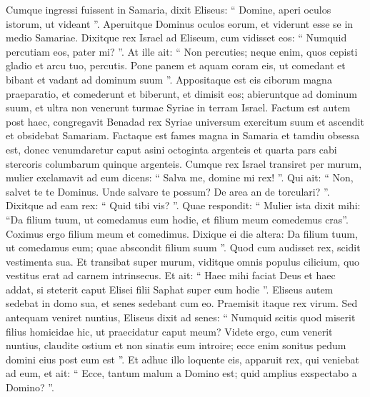 \begin{biblechapter}
\begin{biblechapter}
\begin{biblechapter}
\begin{biblechapter}
\begin{biblechapter}
\begin{biblechapter}
\verse Cumque ingressi fuissent in Samaria, dixit Eliseus: “ Domine, aperi oculos istorum, ut videant ”. Aperuitque Dominus oculos eorum, et viderunt esse se in medio Samariae.
 \verse Dixitque rex Israel ad Eliseum, cum vidisset eos: “ Numquid percutiam eos, pater mi? ”. 
\verse At ille ait: “ Non percuties; neque enim, quos cepisti gladio et arcu tuo, percutis. Pone panem et aquam coram eis, ut comedant et bibant et vadant ad dominum suum ”. 
\verse Appositaque est eis ciborum magna praeparatio, et comederunt et biberunt, et dimisit eos; abieruntque ad dominum suum, et ultra non venerunt turmae Syriae in terram Israel.
 \verse Factum est autem post haec, congregavit Benadad rex Syriae universum exercitum suum et ascendit et obsidebat Samariam. 
\verse Factaque est fames magna in Samaria et tamdiu obsessa est, donec venumdaretur caput asini octoginta argenteis et quarta pars cabi stercoris columbarum quinque argenteis.
 \verse Cumque rex Israel transiret per murum, mulier exclamavit ad eum dicens: “ Salva me, domine mi rex! ”. 
\verse Qui ait: “ Non, salvet te te Dominus. Unde salvare te possum? De area an de torculari? ”. Dixitque ad eam rex: “ Quid tibi vis? ”. Quae respondit: 
\verse “ Mulier ista dixit mihi: “Da filium tuum, ut comedamus eum hodie, et filium meum comedemus cras”. 
\verse Coximus ergo filium meum et comedimus. Dixique ei die altera: Da filium tuum, ut comedamus eum; quae abscondit filium suum ”. 
\verse Quod cum audisset rex, scidit vestimenta sua. Et transibat super murum, viditque omnis populus cilicium, quo vestitus erat ad carnem intrinsecus. 
\verse Et ait: “ Haec mihi faciat Deus et haec addat, si steterit caput Elisei filii Saphat super eum hodie ”.
 \verse Eliseus autem sedebat in domo sua, et senes sedebant cum eo. Praemisit itaque rex virum. Sed antequam veniret nuntius, Eliseus dixit ad senes: “ Numquid scitis quod miserit filius homicidae hic, ut praecidatur caput meum? Videte ergo, cum venerit nuntius, claudite ostium et non sinatis eum introire; ecce enim sonitus pedum domini eius post eum est ”. 
\verse Et adhuc illo loquente eis, apparuit rex, qui veniebat ad eum, et ait: “ Ecce, tantum malum a Domino est; quid amplius exspectabo a Domino? ”.
 

\end{biblechapter}
\end{biblechapter}
\end{biblechapter}
\end{biblechapter}
\end{biblechapter}
\end{biblechapter}
